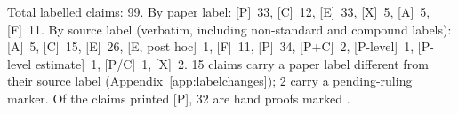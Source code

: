 Total labelled claims: 99. By paper label: [P]~33, [C]~12, [E]~33, [X]~5, [A]~5, [F]~11. By source label (verbatim, including non-standard and compound labels): [A]~5, [C]~15, [E]~26, [E, post hoc]~1, [F]~11, [P]~34, [P+C]~2, [P-level]~1, [P-level estimate]~1, [P/C]~1, [X]~2. 15 claims carry a paper label different from their source label (Appendix~\ref{app:labelchanges}); 2 carry a pending-ruling marker. Of the claims printed [P], 32 are hand proofs marked \unverifiedtag.
